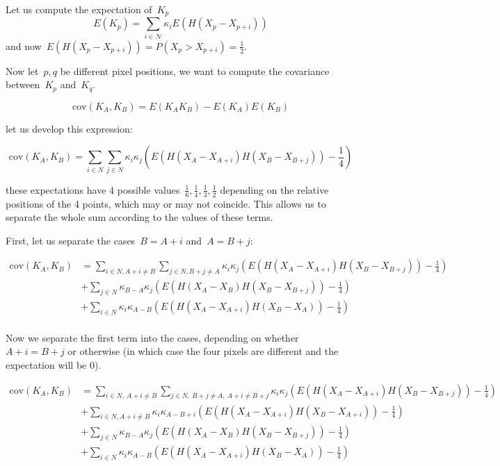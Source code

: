 \documentclass[12pt]{article}                  %
\begin{document}
Let us compute the expectation of~$K_p$
\[
	E(K_p) = \sum_{i\in\mathcal{N}} \kappa_i E(H(X_p - X_{p+i}))
\]
and now~$E(H(X_p-X_{p+i}))=P(X_p>X_{p+i})=\frac12$.

Now let~$p,q$ be different pixel positions, we want to compute the
covariance between~$K_p$ and~$K_q$.

\[
	\mathrm{cov}(K_A,K_B)
	=
	E(K_AK_B)-E(K_A)E(K_B)
\]

let us develop this expression:

\[
	\mathrm{cov}(K_A,K_B)
	=
	\sum_{i\in N}
	\sum_{j\in N}
	\kappa_i\kappa_j
	\left(
	E
	\left(
	H(X_A-X_{A+i})H(X_B-X_{B+j})
	\right)
	-\frac14
	\right)
\]

these expectations have 4 possible values~$\frac16,\frac14,\frac13,\frac12$
depending on the relative positions of the 4 points, which may or may not
coincide.  This allows us to separate the whole sum according to the values of
these terms.

First, let us separate the cases~$B=A+i$ and~$A=B+j$:

\begin{align*}
	\mathrm{cov}(K_A,K_B)
	&=
	\sum_{i\in N,A+i\neq B}
	\sum_{j\in N,B+j\neq A}
	\kappa_i\kappa_j
	\left(
	E
	\left(
	H(X_A-X_{A+i})H(X_B-X_{B+j})
	\right)
	-\frac14
	\right)\\
	&+
	\sum_{j\in N}
	\kappa_{B-A}\kappa_j
	\left(
	E
	\left(
	H(X_A-X_B)H(X_B-X_{B+j})
	\right)
	-\frac14
	\right)\\
	&+
	\sum_{i\in N}
	\kappa_i\kappa_{A-B}
	\left(
	E
	\left(
	H(X_A-X_{A+i})H(X_B-X_A)
	\right)
	-\frac14
	\right)\\
\end{align*}

Now we separate the first term into the cases, depending on
whether~$A+i=B+j$ or otherwise (in which case the four pixels are different
and the expectation will be 0).


\begin{align*}
	\mathrm{cov}(K_A,K_B)
	&=
	\sum_{i\in N,\ A+i\neq B}
	\sum_{j\in N,\ B+j\neq A,\ A+i\neq B+j}
	\kappa_i\kappa_j
	\left(
	E
	\left(
	H(X_A-X_{A+i})H(X_B-X_{B+j})
	\right)
	-\frac14
	\right)\\
	&+
	\sum_{i\in N,A+i\neq B}
	\kappa_i\kappa_{A-B+i}
	\left(
	E
	\left(
	H(X_A-X_{A+i})H(X_B-X_{A+i})
	\right)
	-\frac14
	\right)\\
	&+
	\sum_{j\in N}
	\kappa_{B-A}\kappa_j
	\left(
	E
	\left(
	H(X_A-X_B)H(X_B-X_{B+j})
	\right)
	-\frac14
	\right)\\
	&+
	\sum_{i\in N}
	\kappa_i\kappa_{A-B}
	\left(
	E
	\left(
	H(X_A-X_{A+i})H(X_B-X_A)
	\right)
	-\frac14
	\right)\\
\end{align*}
\end{document}
